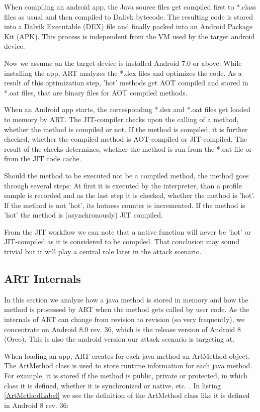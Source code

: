 When compiling an android app, the Java source files get compiled first to *.class files as usual and then compiled to Dalivk bytecode. The resulting code is stored into a  Dalvik Executable (DEX) file and finally packed into an Android Package Kit (APK). This process is independent from the VM used by the target android device.

Now we assume on the target device is installed Android 7.0 or above.
While installing the app, ART analyzes the *.dex files and optimizes the code. As a result of this optimization step, 'hot' methods get AOT compiled and stored in *.oat files, that are binary files for AOT compiled methods.


When an Android app starts, the corresponding *.dex and *.oat files get loaded to memory by ART. The JIT-compiler checks upon the calling of a method, whether the method is compiled or not. If the method is compiled, it is further checked, whether the compiled method is AOT-compiled or JIT-compiled. The result of the checks determines, whether the method is run from the *.oat file or from the JIT code cache.

Should the method to be executed not be a compiled method, the method goes through several steps: At first it is executed by the interpreter, than a profile sample is recorded and as the last step it is checked, whether the method is 'hot'. If the method is not 'hot', its hotness counter is incremented. 
If the method is 'hot' the method is (asynchronously) JIT compiled.

From the JIT workflow we can note that a native function will never be 'hot' or JIT-compiled as it is considered to be compiled. That conclusion may sound trivial but it will play a central role later in the attack scenario. 

\subsection{ART Internals}

In this section we analyze how a java method is stored in memory and how the method is processed by ART when the method gets called by user code. As the internals of ART can change from revision to revision (so very frequently), we concentrate on Android 8.0 rev. 36, which is the release version of Android 8 (Oreo). This is also the android version our attack scenario is targeting at.

When loading an app, ART creates for each java method an ArtMethod object. The ArtMethod class is used to store runtime information for each java method. For example, it is stored if the method is public, private or protected, in which class it is defined, whether it is synchronized or native, etc. . 
In listing \ref{ArtMethodLabel} we see the definition of the ArtMethod class like it is defined in Android 8 rev. 36:

